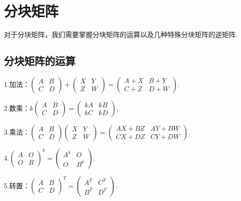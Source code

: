 \chapter{分块矩阵}

对于分块矩阵，我们需要掌握分块矩阵的运算以及几种特殊分块矩阵的逆矩阵.

\section{分块矩阵的运算}

1.加法：$\begin{pmatrix}
		A & B \\
		C & D
	\end{pmatrix}+
	\begin{pmatrix}
		X & Y \\
		Z & W
	\end{pmatrix}=
	\begin{pmatrix}
		A+X & B+Y \\
		C+Z & D+W
	\end{pmatrix}$.

2.数乘：$k\begin{pmatrix}
		A & B \\
		C & D
	\end{pmatrix}=
	\begin{pmatrix}
		kA & kB \\
		kC & kD
	\end{pmatrix}$.

3.乘法：$\begin{pmatrix}
		A & B \\
		C & D
	\end{pmatrix}
	\begin{pmatrix}
		X & Y \\
		Z & W
	\end{pmatrix}=
	\begin{pmatrix}
		AX+BZ & AY+BW \\
		CX+DZ & CY+DW
	\end{pmatrix}$.

4.$\begin{pmatrix}
		A & O \\
		O & B
	\end{pmatrix}^k=\begin{pmatrix}
		A^k & O   \\
		O   & B^k
	\end{pmatrix}$.

5.转置：$\begin{pmatrix}
		A & B \\
		C & D
	\end{pmatrix}^T=\begin{pmatrix}
		A^T & C^T \\
		B^T & D^T
	\end{pmatrix}$.

